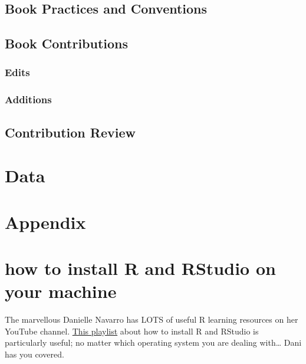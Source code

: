 \documentclass[
  letterpaper,
  DIV=11,
  numbers=noendperiod]{scrreprt}
\begin{document}
\section{Book Practices and
Conventions}\label{book-practices-and-conventions}

\section{Book Contributions}\label{book-contributions}

\subsection{Edits}\label{edits}

\subsection{Additions}\label{additions}

\section{Contribution Review}\label{contribution-review}


\chapter{Data}\label{data}


\chapter{Appendix}\label{appendix}


\chapter{how to install R and RStudio on your
machine}\label{how-to-install-r-and-rstudio-on-your-machine}

The marvellous Danielle Navarro has LOTS of useful R learning resources
on her YouTube channel.
\href{https://www.youtube.com/playlist?list=PLRPB0ZzEYegOZivdelOuEn-R-XUN-DOjd}{This
playlist} about how to install R and RStudio is particularly useful; no
matter which operating system you are dealing with\ldots{} Dani has you
covered.
\end{document}
